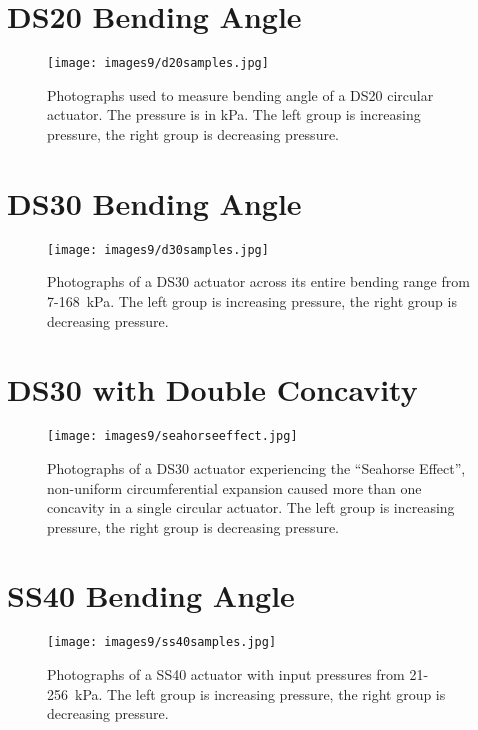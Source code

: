 \clearpage
\chapter{DS20 Bending Angle}
\label{appendix:d20all}

\begin{figure}[ht]
    \centering
     \texttt{[image: images9/d20samples.jpg]}
    \caption{Photographs used to measure bending angle of a DS20 circular actuator. The pressure is in kPa. The left group is increasing pressure, the right group is decreasing pressure.}
    \label{fig:d20samples}
\end{figure}

\chapter{DS30 Bending Angle}
\label{appendix:d30all}

\begin{figure}[ht]
    \centering
     \texttt{[image: images9/d30samples.jpg]}
    \caption{Photographs of a DS30 actuator across its entire bending range from 7-168~kPa. The left group is increasing pressure, the right group is decreasing pressure.}
    \label{fig:d30samples}
\end{figure}

\chapter{DS30 with Double Concavity}
\label{appendix:d30seahorse}

\begin{figure}[ht]
    \centering
     \texttt{[image: images9/seahorseeffect.jpg]}
    \caption{Photographs of a DS30 actuator experiencing the ``Seahorse Effect'', non-uniform circumferential expansion caused more than one concavity in a single circular actuator. The left group is increasing pressure, the right group is decreasing pressure.}
    \label{fig:seahorseeffect}
\end{figure}

\chapter{SS40 Bending Angle}
\label{appendix:s40all}

\begin{figure}[ht]
    \centering
     \texttt{[image: images9/ss40samples.jpg]}
    \caption{Photographs of a SS40 actuator with input pressures from 21-256~kPa. The left group is increasing pressure, the right group is decreasing pressure.}
    \label{fig:ss40samples}
\end{figure}

